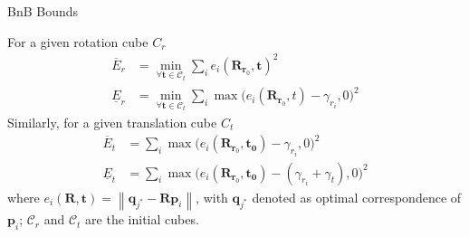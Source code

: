 \documentclass[aspectratio=1610]{beamer}
\renewcommand*{\cite}{\parencite}
\newcommand{\norm}[1]{\left\lVert#1\right\rVert}
\begin{document}
\begin{frame}{BnB Bounds}


For a given rotation cube $C_r$
\begin{equation}
  \begin{array}{ll} 
  \overline{E}_r &= \min\limits_{\forall\bm{t}\in\mathcal{C}_t} \sum\limits_i e_i (\bm{R}_{\bm{r}_0}, \bm{t})^2 \\
  \underline{E}_r &= \min\limits_{\forall\bm{t}\in\mathcal{C}_t} \sum\limits_i \max \big(e_i(\bm{R}_{\bm{r}_0},t)-\gamma_{r_i},0\big)^2
  \end{array}
\end{equation}
Similarly, for a given translation cube $C_t$
\begin{equation}
\begin{array}{ll}
  \overline{E}_t &= \sum\limits_i \max\big( e_i(\bm{R}_{\bm{r}_0},\bm{t_0})-\gamma_{r_i}, 0 \big)^2 \\
  \underline{E}_t &= \sum\limits_i \max \big( e_i(\bm{R}_{\bm{r}_0},\bm{t_0}) - (\gamma_{r_i} + \gamma_t),0 \big)^2
\end{array}
\label{eq:goicp_outerbound}
\end{equation}
where $e_i(\bm{R},\bm{t})=\norm{\bm{q}_{j^*}-\bm{R}\bm{p}_i}$, with $\bm{q}_{j^*}$ denoted as optimal correspondence of $\bm{p}_i$; $\mathcal{C}_r$ and $\mathcal{C}_t$ are the initial cubes.
\end{frame}
\end{document}
